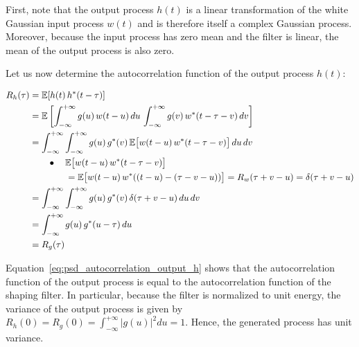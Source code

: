 First, note that the output process $h(t)$ is a linear transformation of the white Gaussian input process $w(t)$ and is therefore itself a complex Gaussian process.
Moreover, because the input process has zero mean and the filter is linear, the mean of the output process is also zero.

Let us now determine the autocorrelation function of the output process $h(t)$:
\begin{fleqn}[0.75cm]
\begin{align}
    R_h(\tau) 
    &= \mathbb{E}[h(t) \, h^*(t-\tau)] \notag \\
    &= \mathbb{E}\left[ \int_{-\infty}^{+\infty} g(u) \, w(t-u) \, du \, \int_{-\infty}^{+\infty} g(v) \, w^*(t-\tau-v) \, dv \right] \notag \\
    &= \int_{-\infty}^{+\infty} \int_{-\infty}^{+\infty} g(u) \, g^*(v) \, \mathbb{E}\big[w(t-u) \, w^*(t-\tau-v)\big] \, du \, dv \notag \\
    & \qquad \bullet \quad \mathbb{E}\big[w(t-u) \, w^*(t-\tau-v)\big] \notag \\
    & \qquad \quad \quad = \mathbb{E}\big[w(t-u) \, w^*((t-u) - (\tau-v-u))\big] = R_w(\tau + v - u) = \delta(\tau + v - u) \notag \\
    &= \int_{-\infty}^{+\infty} \int_{-\infty}^{+\infty} g(u) \, g^*(v) \, \delta(\tau + v - u) \, du \, dv \notag \\
    &= \int_{-\infty}^{+\infty} g(u) \, g^*(u-\tau) \, du \notag \\
    &= R_g(\tau) \label{eq:psd_autocorrelation_output_h}
\end{align}
\end{fleqn}

Equation~\eqref{eq:psd_autocorrelation_output_h} shows that the autocorrelation function of the output process is equal to the autocorrelation function of the shaping filter.
In particular, because the filter is normalized to unit energy, the variance of the output process is given by $R_h(0) = R_g(0) = \int_{-\infty}^{+\infty} |g(u)|^2 du = 1$.
Hence, the generated process has unit variance.

